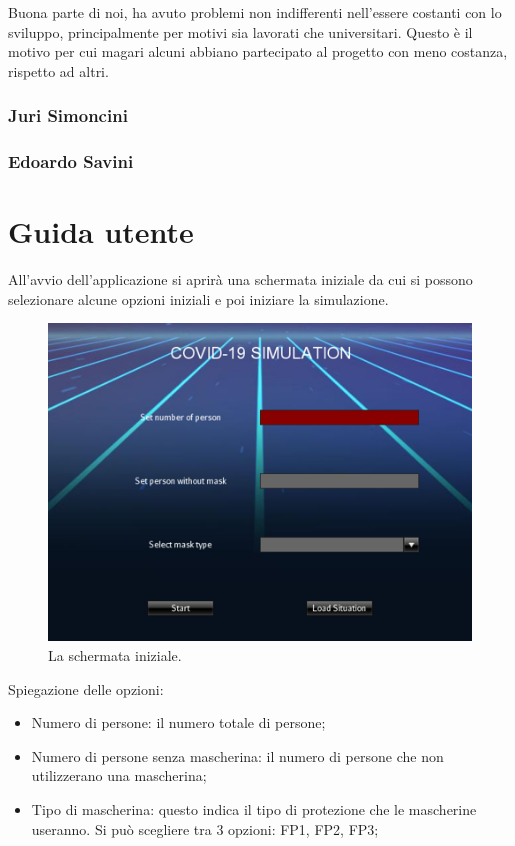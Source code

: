 \documentclass[a4paper,12pt]{report}
\begin{document}
Buona parte di noi, ha avuto problemi non indifferenti nell'essere costanti con lo sviluppo, principalmente per motivi sia lavorati che universitari.
Questo è il motivo per cui magari alcuni abbiano partecipato al progetto con meno costanza, rispetto ad altri.

\subsection{Juri Simoncini}

\subsection{Edoardo Savini}

\appendix

\chapter{Guida utente}

All'avvio dell'applicazione si aprirà una schermata iniziale da cui si possono selezionare alcune opzioni iniziali e poi iniziare la simulazione.

\begin{figure}[h]
\centering{}
\includegraphics{1.png} 
\caption{La schermata iniziale.}
\label{img:startscreen}
\end{figure}

Spiegazione delle opzioni:
\begin{itemize}
\item Numero di persone: il numero totale di persone;
\item Numero di persone senza mascherina: il numero di persone che non utilizzerano una mascherina;
\item Tipo di mascherina: questo indica il tipo di protezione che le mascherine useranno. Si può scegliere tra 3 opzioni: FP1, FP2, FP3;
\end{itemize}
\end{document}

